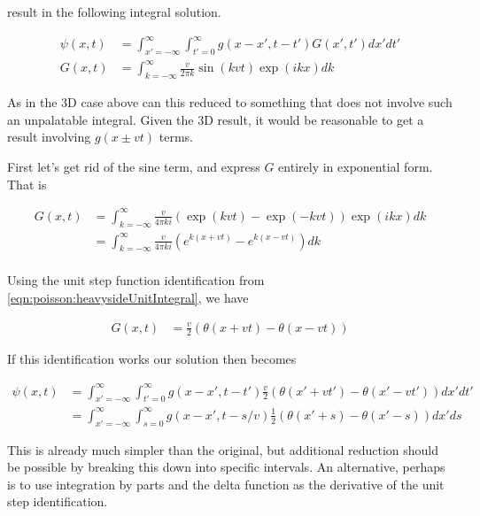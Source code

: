 result in the following integral solution.

\begin{align}\label{eqn:poisson:oneDimResult}
{\psi}(x, t)
&=
\int_{x'=-\infty}^\infty
\int_{t' = 0}^\infty {g}(x-x', t-t') G(x', t') dx' dt' \\
G(x, t) &=
\int_{k = -\infty}^\infty
\frac{v}{2\pi {k}}
\sin( {k} v t )
\exp( i k x )
dk
\end{align}

As in the 3D case above can this reduced to something that does not involve such an unpalatable integral.
Given the 3D result, it would be reasonable to get a result involving $g(x \pm vt)$ terms.

First let's get rid of the sine term, and express $G$ entirely in exponential form.  That is

\begin{align*}
G(x, t)
&=
\int_{k = -\infty}^\infty
\frac{v}{4\pi k i }
\left(\exp( {k} v t ) -\exp( -{k} v t )\right) \exp( i k x )
dk \\
&=
\int_{k = -\infty}^\infty
\frac{v}{4\pi k i }
\left(e^{ {k} (x + v t ) } - e^{ {k} (x - v t) }\right) 
dk \\
\end{align*}

Using the unit step function identification from \ref{eqn:poisson:heavysideUnitIntegral}, we have

\begin{align}
G(x, t) &= \frac{v}{2} \left(\theta(x + v t )  - \theta(x - v t) \right) 
\end{align}

If this identification works our solution then becomes

\begin{align*}
{\psi}(x, t)
&=
\int_{x'=-\infty}^\infty
\int_{t'= 0}^\infty
{g}(x-x', t-t')
\frac{v}{2} \left(\theta(x' + v t' )  - \theta(x' - v t') \right) 
dx' dt' \\
&=
\int_{x'=-\infty}^\infty
\int_{s= 0}^\infty
{g}(x-x', t-s/v)
\frac{1}{2} \left(\theta(x' + s )  - \theta(x' - s) \right) 
dx' ds
\end{align*}

This is already much simpler than the original, but additional reduction should be possible by breaking this down into specific intervals.  An
alternative, perhaps is to use integration by parts and the delta function as the derivative of the unit step identification.


